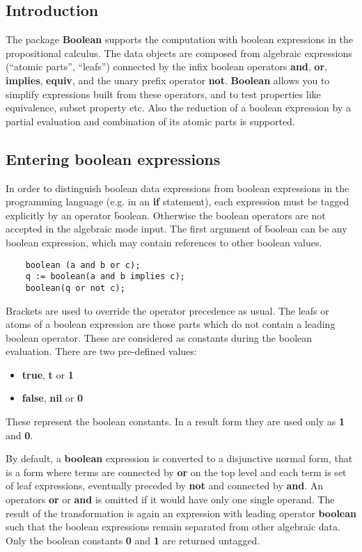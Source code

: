 
\subsection{Introduction}

The package {\bf Boolean} supports the computation with
boolean expressions in the propositional calculus.
The data objects are composed from algebraic expressions (``atomic parts'', ``leafs'')
connected by the infix boolean operators {\bf and}, {\bf or}, 
{\bf implies}, {\bf equiv}, and the unary prefix operator
{\bf not}. {\bf Boolean} allows you to simplify expressions
built from these operators, and to test properties like
equivalence, subset property etc. Also the reduction of
a boolean expression by a partial evaluation and combination
of its atomic parts is supported.

\subsection{Entering boolean expressions}

In order to distinguish boolean data expressions from 
boolean expressions in the \REDUCE programming
language (e.g. in an {\bf if} statement), each expression
must be tagged explicitly by an operator \f{boolean}.
Otherwise the boolean operators are not accepted in the
\REDUCE  algebraic mode input.
The first argument of \f{boolean} can be any boolean expression,
which may contain references to other boolean values.
\begin{verbatim}
    boolean (a and b or c);
    q := boolean(a and b implies c);
    boolean(q or not c);
\end{verbatim}
Brackets are used to override the operator precedence as usual.
The leafs or atoms of a boolean expression are those parts which
do not contain a leading boolean operator. These are
considered as constants during the boolean evaluation. There
are two pre-defined values:
\begin{itemize}
\item {\bf true}, {\bf t} or {\bf 1}
\item {\bf false}, {\bf nil} or {\bf 0}
\end{itemize}
These represent the boolean constants. In a result
form they are used only as {\bf 1} and {\bf 0}.

By default, a {\bf boolean} expression is converted  to a
disjunctive normal form, that is a form where terms are connected
by {\bf or} on the top level and each term is set of leaf
expressions, eventually preceded by {\bf not} and connected
by  {\bf and}. An operators {\bf or} or {\bf and} is omitted
if it would have only one single operand. The result of
the transformation is again an expression with leading 
operator {\bf boolean} such that the boolean expressions
remain separated from other algebraic data. Only the boolean
constants {\bf 0} and {\bf 1} are returned untagged.

